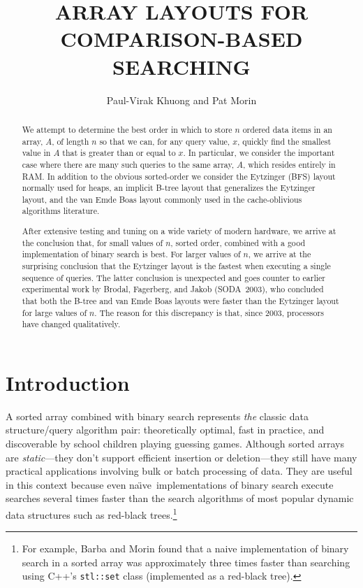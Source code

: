 \documentclass{patmorin}
\title{\MakeUppercase{Array Layouts for Comparison-Based Searching}}
\author{Paul-Virak Khuong and Pat Morin}
\newcommand{\naive}{na\"{\i}ve}
\begin{document}
\begin{titlepage}
\maketitle

\begin{abstract}
  We attempt to determine the best order in which to store $n$ ordered
  data items in an array, $A$, of length $n$ so that we can, for any query
  value, $x$, quickly find the smallest value in $A$ that is greater
  than or equal to $x$. In particular, we consider the important case
  where there are many such queries to the same array, $A$, which resides
  entirely in RAM.  In addition to the obvious sorted-order we consider
  the Eytzinger (BFS) layout normally used for heaps, an implicit B-tree
  layout that generalizes the Eytzinger layout, and the van Emde Boas
  layout commonly used in the cache-oblivious algorithms literature.

  After extensive testing and tuning on a wide variety of modern hardware,
  we arrive at the conclusion that, for small values of $n$, sorted
  order, combined with a good implementation of binary search is best.
  For larger values of $n$, we arrive at the surprising conclusion that
  the Eytzinger layout is the fastest when executing a single sequence
  of queries.  The latter conclusion is unexpected and goes counter to
  earlier experimental work by Brodal, Fagerberg, and Jakob (SODA~2003),
  who concluded that both the B-tree and van Emde Boas layouts were faster
  than the Eytzinger layout for large values of $n$.  The reason for this
  discrepancy is that, since 2003, processors have changed qualitatively.
\end{abstract}

\end{titlepage}

\section{Introduction}

A sorted array combined with binary search represents \emph{the} classic
data structure/query algorithm pair: theoretically optimal, fast in
practice, and discoverable by school children playing guessing games.
Although sorted arrays are \emph{static}---they don't support efficient
insertion or deletion---they still have many practical applications
involving bulk or batch processing of data.  They are useful in this
context because even \naive\ implementations of binary search execute
searches several times faster than the search algorithms of most
popular dynamic data structures such as red-black trees.\footnote{For
example, Barba and Morin \cite{bmXX} found that a naive implementation
of binary search in a sorted array was approximately three times faster
than searching using C++'s \texttt{stl::set} class (implemented as a
red-black tree).}
\end{document}
